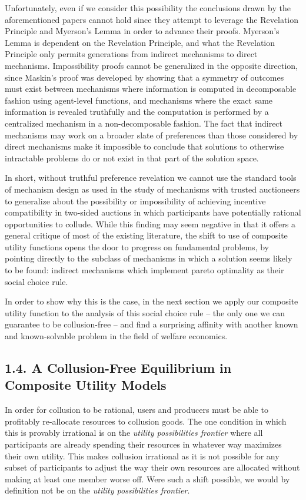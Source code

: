 \documentclass[oneside]{article}   	%
\begin{document}
Unfortunately, even if we consider this possibility the conclusions drawn by the aforementioned papers cannot hold since they attempt to leverage the Revelation Principle and Myerson's Lemma in order to advance their proofs. Myerson's Lemma is dependent on the Revelation Principle, and what the Revelation Principle only permits generations from indirect mechanisms to direct mechanisms. Impossibility proofs cannot be generalized in the opposite direction, since Maskin's proof was developed by showing that a symmetry of outcomes must exist between mechanisms where information is computed in decomposable fashion using agent-level functions, and mechanisms where the exact same information is revealed truthfully and the computation is performed by a centralized mechanism in a non-decomposable fashion. The fact that indirect mechanisms may work on a broader slate of preferences than those considered by direct mechanisms make it impossible to conclude that solutions to otherwise intractable problems do or not exist in that part of the solution space.

In short, without truthful preference revelation we cannot use the standard tools of mechanism design as used in the study of mechanisms with trusted auctioneers to generalize about the possibility or impossibility of achieving incentive compatibility in two-sided auctions in which participants have potentially rational opportunities to collude. While this finding may seem negative in that it offers a general critique of most of the existing literature, the shift to use of composite utility functions opens the door to progress on fundamental problems, by pointing directly to the subclass of mechanisms in which a solution seems likely to be found: indirect mechanisms which implement pareto optimality as their social choice rule.

In order to show why this is the case, in the next section we apply our composite utility function to the analysis of this social choice rule -- the only one we can guarantee to be collusion-free -- and find a surprising affinity with another known and known-solvable problem in the field of welfare economics.


\subsection*{1.4. A Collusion-Free Equilibrium in Composite Utility Models}

In order for collusion to be rational, users and producers must be able to profitably re-allocate resources to collusion goods. The one condition in which this is provably irrational is on the \textit{utility possibilities frontier} where all participants are already spending their resources in whatever way maximizes their own utility. This makes collusion irrational as it is not possible for any subset of participants to adjust the way their own resources are allocated without making at least one member worse off. Were such a shift possible, we would by definition not be on the \textit{utility possibilities frontier}.
\end{document}
